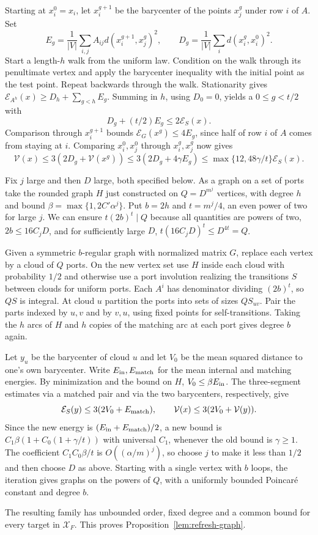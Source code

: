 Starting at $x_i^0=x_i$, let $x_i^{g+1}$ be the barycenter of the points
$x_j^g$ under row $i$ of $A$. Set
\[
 E_g=\frac1{|V|}\sum_{i,j}A_{ij}d(x_i^{g+1},x_j^g)^2,
 \qquad D_g=\frac1{|V|}\sum_i d(x_i^g,x_i^0)^2.
\]
Start a length-$h$ walk from the uniform law. Condition on the walk through its
penultimate vertex and apply the barycenter inequality with the initial
point as the test point. Repeat backwards through the walk. Stationarity
gives $\mathcal E_{A^h}(x)\ge D_h+\sum_{g<h}E_g$. Summing in $h$, using
$D_0=0$, yields a $0\le g<t/2$ with
\[
 D_g+(t/2)E_g\le2\mathcal E_S(x).
\]
Comparison through $x_i^{g+1}$ bounds $\mathcal E_G(x^g)\le4E_g$, since
half of row $i$ of $A$ comes from staying at $i$. Comparing $x_i^0,x_j^0$
through $x_i^g,x_j^g$ now gives
\[
 \mathcal V(x)\le 3(2D_g+\mathcal V(x^g))
 \le3(2D_g+4\gamma E_g)
 \le\max\{12,48\gamma/t\}\mathcal E_S(x).
\]

Fix $j$ large and then $D$ large, both specified below. As a graph on a
set of ports take the rounded graph $H$ just constructed on $Q=D^{m^j}$
vertices, with degree $h$ and bound $\beta=\max\{1,2C'\alpha^j\}$.
Put $b=2h$ and $t=m^j/4$, an even power of two for large $j$. We can
ensure $t(2b)^t\mid Q$ because all quantities are powers of two, $2b\le16C_jD$,
and for sufficiently large $D$,
$t(16C_jD)^t\le D^{4t}=Q$.

Given a symmetric $b$-regular graph with normalized matrix $G$, replace
each vertex by a cloud of $Q$ ports. On the new vertex set use $H$ inside
each cloud with probability $1/2$ and otherwise use a port
involution realizing the transitions $S$ between clouds for uniform
ports. Each $A^i$ has denominator dividing $(2b)^t$, so $QS$ is integral.
At cloud $u$ partition the ports into sets of sizes $QS_{uv}$. Pair the parts indexed by $u,v$ and by $v,u$,
using fixed points for self-transitions. Taking the $h$ arcs of $H$ and
$h$ copies of the matching arc at each port gives degree $b$ again.

Let $y_u$ be the barycenter of cloud $u$ and let $V_0$ be the mean squared
distance to one's own barycenter. Write $E_{\rm in},E_{\rm match}$ for the
mean internal and matching energies. By minimization and the bound on $H$,
$V_0\le\beta E_{\rm in}$. The three-segment estimates via a matched pair
and via the two barycenters, respectively, give
\[
 \mathcal E_S(y)\le3(2V_0+E_{\rm match}),\qquad
 \mathcal V(x)\le3(2V_0+\mathcal V(y)).
\]
Since the new energy is $(E_{\rm in}+E_{\rm match})/2$, a new bound is
$C_1\beta(1+C_0(1+\gamma/t))$ with universal $C_1$, whenever the old bound
is $\gamma\ge1$. The coefficient $C_1 C_0\beta/t$ is
$O((\alpha/m)^j)$, so choose $j$ to make it less than $1/2$ and then
choose $D$ as above. Starting with a single vertex with $b$ loops, the
iteration gives graphs on the powers of $Q$, with a uniformly bounded
Poincar\'e constant and degree $b$.

The resulting family has unbounded order, fixed degree and a common
bound for every target in $\mathcal X_F$. This proves
Proposition~\ref{lem:refresh-graph}.
